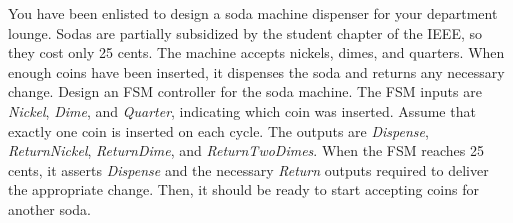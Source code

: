 \documentclass[12pt]{article}
\newenvironment{ex}[2][Exercise]{\begin{trivlist}
		\item[\hskip \labelsep {\bfseries #1}\hskip \labelsep {\bfseries #2.}]}{\end{trivlist}}
\begin{document}
\begin{ex}{3.26}
	You have been enlisted to design a soda machine dispenser for your department lounge.
	Sodas are partially subsidized by the student chapter of the IEEE, so they cost only
	25 cents. The machine accepts nickels, dimes, and quarters. When enough coins have been
	inserted, it dispenses the soda and returns any necessary change. Design an FSM
	controller for the soda machine. The FSM inputs are \emph{Nickel}, \emph{Dime}, and \emph{Quarter},
	indicating which coin was inserted. Assume that exactly one coin is inserted on each cycle.
	The outputs are \emph{Dispense}, \emph{ReturnNickel}, \emph{ReturnDime}, and \emph{ReturnTwoDimes}.
	When the FSM reaches 25 cents, it asserts \emph{Dispense} and the necessary \emph{Return}
	outputs required to deliver the appropriate change. Then, it should be ready to start
	accepting coins for another soda.
\end{ex}
\end{document}
